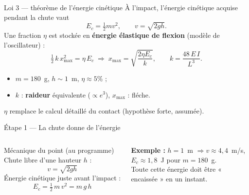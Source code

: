 \documentclass[11pt,aspectratio=169]{beamer}
\newcommand{\sol}[2]{%
  \draw[thick](#1,0)--(#2,0);
  \foreach \xx in {#1,...,#2}{\draw[gristik](\xx,0)--(\xx-0.25,-0.25);}}
\newcommand{\phone}[3]{%
  \draw[#3,fill=#3!12,thick,rounded corners=2pt]
       (#1-0.32,#2-0.62) rectangle (#1+0.32,#2+0.62);
  \draw[#3!60] (#1-0.24,#2-0.45) rectangle (#1+0.24,#2+0.45);}
\begin{document}
\begin{frame}{Loi 3 --- théorème de l'énergie cinétique}
  \footnotesize
  À l'impact, l'énergie cinétique acquise pendant la chute vaut
  \[ E_c=\tfrac12 m v^{2},\qquad v=\sqrt{2gh}. \]
  Une fraction $\eta$ est stockée en \textbf{énergie élastique de flexion}
  (modèle de l'oscillateur) :
  \[ \tfrac12\,k\,x_{\max}^{2}=\eta\,E_c
     \;\Rightarrow\; x_{\max}=\sqrt{\frac{2\eta E_c}{k}},\qquad
     k=\frac{48\,E\,I}{L^{3}}. \]
  \begin{itemize}
    \item $m=180$~g, $h\sim 1$~m, $\eta\approx 5\%$ ;
    \item $k$ : \textbf{raideur} équivalente ($\propto e^{3}$), $x_{\max}$ : fléche.
  \end{itemize}
  \centering\textcolor{danger}{$\eta$ remplace le calcul détaillé du contact
  (hypothèse forte, assumée).}
\end{frame}



\begin{frame}{Étape 1 --- La chute donne de l'énergie}
  \begin{columns}[c]
    \begin{block}{Mécanique du point (au programme)}
    Chute libre d'une hauteur $h$ :
    \[ v=\sqrt{2gh} \]
    Énergie cinétique juste avant l'impact :
    \[ E_c=\tfrac12\,m\,v^{2}=m\,g\,h \]
    \end{block}
    \footnotesize\textbf{Exemple :} $h=1$~m $\Rightarrow v\approx 4{,}4$~m/s,
    $E_c\approx 1{,}8$~J pour $m=180$~g.\\[4pt]
    \textcolor{danger}{Toute cette énergie doit être « encaissée » en un instant.}
  \end{columns}
\end{frame}
\end{document}
